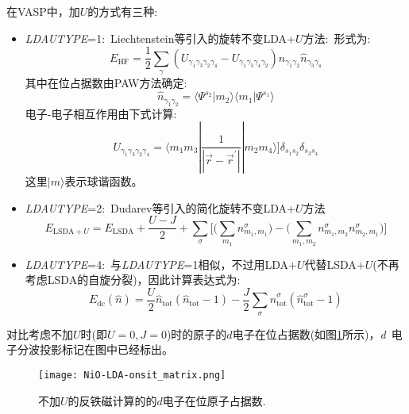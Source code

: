 在\textrm{VASP}中，加$U$的方式有三种:~
\begin{itemize}
	\item \textit{LDAUTYPE}=1:~\textrm{Liechtenstein}等引入的旋转不变\textrm{LDA}+$U$方法\cite{PRB52-R5467_1995}:~形式为:
		\begin{displaymath}
			E_{\mathrm{HF}}=\dfrac12\sum_{\gamma}(U_{\gamma_1\gamma_3\gamma_2\gamma_4}-U_{\gamma_1\gamma_3\gamma_4\gamma_2})\hat{n}_{\gamma_1\gamma_2}\hat{n}_{\gamma_3\gamma_4}
		\end{displaymath}
		其中在位占据数由\textrm{PAW}方法确定:~
		\begin{displaymath}
			\hat{n}_{\gamma_1\gamma_2}=\langle\Psi^{s_2}|m_2\rangle\langle m_1|\Psi^{s_1}\rangle
		\end{displaymath}
		电子-电子相互作用由下式计算:
		\begin{displaymath}
			U_{\gamma_1\gamma_3\gamma_2\gamma_4}=\langle m_1m_3|\dfrac1{|\vec r-\vec r^{\prime}|}|m_2m_4\rangle]\delta_{s_1s_2}\delta_{s_3s_4}
		\end{displaymath}
		这里$|m\rangle$表示球谐函数。
	\item \textit{LDAUTYPE}=2:~\textrm{Dudarev}等引入的简化旋转不变\textrm{LDA}+$U$方法\cite{PRB57-1505_1998}
		\begin{displaymath}
			E_{\mathrm{LSDA+}U}=E_{\mathrm{LSDA}}+\dfrac{U-J}2+\sum_{\sigma}\bigg[\bigg(\sum_{m_1}n_{m_1,m_1}^{\sigma}\bigg)-\bigg(\sum_{m_1,m_2}n_{m_1,m_2}^{\sigma}n_{m_2,m_1}^{\sigma}\bigg)\bigg]
		\end{displaymath}
	\item \textit{LDAUTYPE}=4:~与\textit{LDAUTYPE}=1相似，不过用\textrm{LDA}+$U$代替\textrm{LSDA}+$U$(不再考虑\textrm{LSDA}的自旋分裂)，因此计算表达式为:~
		\begin{displaymath}
			E_{\mathrm{dc}}(\hat n)=\dfrac{U}2\hat{n}_{\mathrm{tot}}(\hat{n}_{\mathrm{tot}}-1)-\dfrac{J}2\sum_{\sigma}\hat{n}_{\mathrm{tot}}^{\sigma}(\hat{n}_{\mathrm{tot}}^{\sigma}-1)
		\end{displaymath}
\end{itemize}

对比考虑不加$U$时(即$U=0,J=0$)时的原子的$d$电子在位占据数(如图\ref{NiO-LDA-onsite_matrix}所示)，\textit{d}~电子分波投影标记在图中已经标出。
\begin{figure}[h!]
\centering
\texttt{[image: NiO-LDA-onsit\_matrix.png]}
\caption{\small \textrm{不加$U$的反铁磁计算的的$d$电子在位原子占据数.}}%
\label{NiO-LDA-onsite_matrix}
\end{figure}

